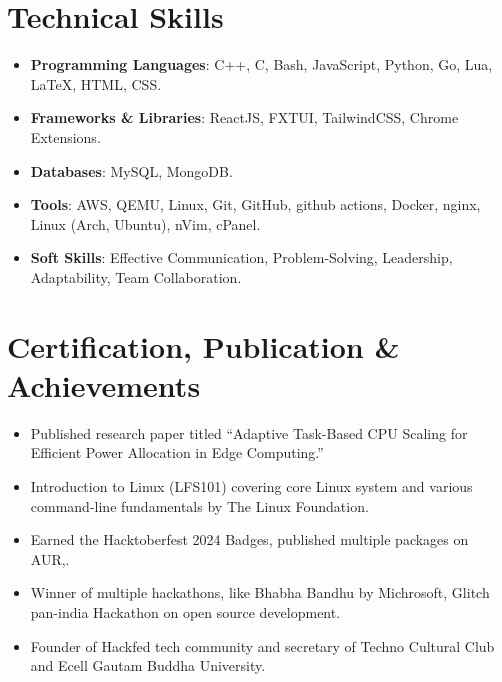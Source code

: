 \documentclass[letterpaper,10pt]{article}
\newcommand{\resumeItem}[1]{\item\small{#1 \vspace{-2pt}}}
\newcommand{\resumeItemListStart}{\begin{itemize}}
\newcommand{\resumeItemListEnd}{\end{itemize}\vspace{-5pt}}
\begin{document}
\section{Technical Skills}
   \resumeItemListStart[label={}]
      \resumeItem{  \textbf{Programming Languages}: C++, C, Bash, JavaScript, Python, Go, Lua, LaTeX, HTML, CSS. } 
       \resumeItem{ \textbf{Frameworks \& Libraries}: ReactJS, FXTUI, TailwindCSS, Chrome Extensions. }
       \resumeItem{\textbf{Databases}: MySQL, MongoDB. }
       \resumeItem{\textbf{Tools}: AWS, QEMU, Linux, Git, GitHub, github actions, Docker, nginx, Linux (Arch, Ubuntu), nVim, cPanel. }
       \resumeItem{ \textbf{Soft Skills}: Effective Communication, Problem-Solving, Leadership, Adaptability, Team Collaboration. }
  \resumeItemListEnd

\section{Certification, Publication \& Achievements}
\resumeItemListStart
  \resumeItem{Published research paper titled “Adaptive Task-Based CPU Scaling for Efficient Power Allocation in Edge Computing.”}
  \resumeItem{Introduction to Linux (LFS101) covering core Linux system and various command-line fundamentals by The Linux Foundation.}
  \resumeItem{Earned the Hacktoberfest 2024 Badges, published multiple packages on AUR,.}
  \resumeItem{Winner of multiple hackathons, like Bhabha Bandhu by Michrosoft, Glitch pan-india Hackathon on open source development.}
  \resumeItem{Founder of Hackfed tech community and secretary of Techno Cultural Club and Ecell Gautam Buddha University.}
\resumeItemListEnd
\end{document}
